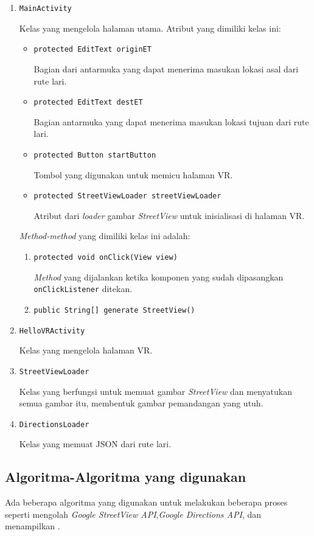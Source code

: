 \begin{enumerate}
	\item \texttt{MainActivity}
	
	Kelas yang mengelola halaman utama. Atribut yang dimiliki kelas ini:
	
	\begin{itemize}
		\item \texttt{protected EditText originET}
		
		Bagian dari antarmuka yang dapat menerima masukan lokasi asal dari rute lari.
		\item \texttt{protected EditText destET}
		
		Bagian antarmuka yang dapat menerima masukan lokasi tujuan dari rute lari.
		\item \texttt{protected Button startButton}
		
		Tombol yang digunakan untuk memicu halaman VR.
		\item \texttt{protected StreetViewLoader streetViewLoader}
		
		Atribut dari \textit{loader} gambar \textit{StreetView} untuk inisialisasi di halaman VR.
	\end{itemize}
	
	\textit{Method-method} yang dimiliki kelas ini adalah:
	
	\begin{enumerate}
		\item \texttt{protected void onClick(View view)}
		
		\textit{Method} yang dijalankan ketika komponen yang sudah dipasangkan \texttt{onClickListener} ditekan. 
		\item \texttt{public String[] generate StreetView()}
		
	\end{enumerate}
	\item \texttt{HelloVRActivity}
	
	Kelas yang mengelola halaman VR.
	\item \texttt{StreetViewLoader}
	
	Kelas yang berfungsi untuk memuat gambar \textit{StreetView} dan menyatukan semua gambar itu, membentuk gambar pemandangan yang utuh.  
	\item \texttt{DirectionsLoader}
	
	Kelas yang memuat JSON dari rute lari. 
\end{enumerate} 


\subsection{Algoritma-Algoritma yang digunakan}
Ada beberapa algoritma yang digunakan   untuk melakukan beberapa proses seperti mengolah \textit{Google StreetView API},\textit{Google Directions API}, dan menampilkan .

